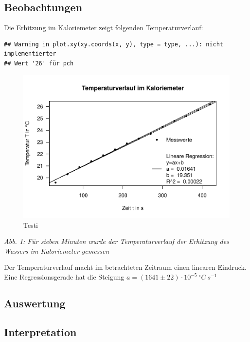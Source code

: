 \documentclass[
  9pt,
]{article}
\begin{document}
\hypertarget{beobachtungen}{%
\subsection{Beobachtungen}\label{beobachtungen}}

Die Erhitzung im Kaloriemeter zeigt folgenden Temperaturverlauf:

\begin{verbatim}
## Warning in plot.xy(xy.coords(x, y), type = type, ...): nicht implementierter
## Wert '26' für pch
\end{verbatim}

\begin{figure}

{\centering \includegraphics{Kaloriemeter2_files/figure-latex/unnamed-chunk-1-1} 

}

\caption{Testi}\label{fig:unnamed-chunk-1}
\end{figure}

\emph{Abb. 1: Für sieben Minuten wurde der Temperaturverlauf der
Erhitzung des Wassers im Kaloriemeter gemessen}

Der Temperaturverlauf macht im betrachteten Zeitraum einen linearen
Eindruck. Eine Regressionsgerade hat die Steigung
\(a=(1641\pm 22)\cdot 10^{-5}\ ^{\circ} C\ s^{-1}\)

\hypertarget{auswertung}{%
\subsection{Auswertung}\label{auswertung}}

\hypertarget{interpretation}{%
\subsection{Interpretation}\label{interpretation}}
\end{document}

